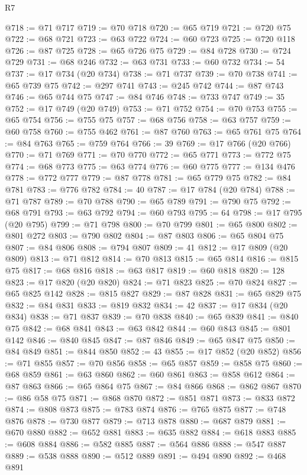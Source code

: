 \begin{lexlean}{R7}
\begin{coremodule}
@718 := @71 @717
@719 := @70 @718
@720 := @65 @719
@721 := @720 @75
@722 := @68 @721
@723 := @63 @722
@724 := @60 @723
@725 := @720 @118
@726 := @87 @725
@728 := @65 @726 @75
@729 := @84 @728
@730 := @724 @729
@731 := @68 @246
@732 := @63 @731
@733 := @60 @732
@734 := 54
@737 := @17 @734 (@20 @734)
@738 := @71 @737
@739 := @70 @738
@741 := @65 @739 @75
@742 := @297 @741
@743 := @245 @742
@744 := @87 @743
@746 := @65 @744 @75
@747 := @84 @746
@748 := @733 @747
@749 := 35
@752 := @17 @749 (@20 @749)
@753 := @71 @752
@754 := @70 @753
@755 := @65 @754
@756 := @755 @75
@757 := @68 @756
@758 := @63 @757
@759 := @60 @758
@760 := @755 @462
@761 := @87 @760
@763 := @65 @761 @75
@764 := @84 @763
@765 := @759 @764
@766 := 39
@769 := @17 @766 (@20 @766)
@770 := @71 @769
@771 := @70 @770
@772 := @65 @771
@773 := @772 @75
@774 := @68 @773
@775 := @63 @774
@776 := @60 @775
@777 := @134 @476
@778 := @772 @777
@779 := @87 @778
@781 := @65 @779 @75
@782 := @84 @781
@783 := @776 @782
@784 := 40
@787 := @17 @784 (@20 @784)
@788 := @71 @787
@789 := @70 @788
@790 := @65 @789
@791 := @790 @75
@792 := @68 @791
@793 := @63 @792
@794 := @60 @793
@795 := 64
@798 := @17 @795 (@20 @795)
@799 := @71 @798
@800 := @70 @799
@801 := @65 @800
@802 := @801 @272
@803 := @790 @802
@804 := @87 @803
@806 := @65 @804 @75
@807 := @84 @806
@808 := @794 @807
@809 := 41
@812 := @17 @809 (@20 @809)
@813 := @71 @812
@814 := @70 @813
@815 := @65 @814
@816 := @815 @75
@817 := @68 @816
@818 := @63 @817
@819 := @60 @818
@820 := 128
@823 := @17 @820 (@20 @820)
@824 := @71 @823
@825 := @70 @824
@827 := @65 @825 @142
@828 := @815 @827
@829 := @87 @828
@831 := @65 @829 @75
@832 := @84 @831
@833 := @819 @832
@834 := 42
@837 := @17 @834 (@20 @834)
@838 := @71 @837
@839 := @70 @838
@840 := @65 @839
@841 := @840 @75
@842 := @68 @841
@843 := @63 @842
@844 := @60 @843
@845 := @801 @142
@846 := @840 @845
@847 := @87 @846
@849 := @65 @847 @75
@850 := @84 @849
@851 := @844 @850
@852 := 43
@855 := @17 @852 (@20 @852)
@856 := @71 @855
@857 := @70 @856
@858 := @65 @857
@859 := @858 @75
@860 := @68 @859
@861 := @63 @860
@862 := @60 @861
@863 := @858 @612
@864 := @87 @863
@866 := @65 @864 @75
@867 := @84 @866
@868 := @862 @867
@870 := @86 @58 @75
@871 := @868 @870
@872 := @851 @871
@873 := @833 @872
@874 := @808 @873
@875 := @783 @874
@876 := @765 @875
@877 := @748 @876
@878 := @730 @877
@879 := @713 @878
@880 := @687 @879
@881 := @670 @880
@882 := @652 @881
@883 := @635 @882
@884 := @618 @883
@885 := @608 @884
@886 := @582 @885
@887 := @564 @886
@888 := @547 @887
@889 := @538 @888
@890 := @512 @889
@891 := @494 @890
@892 := @468 @891

\end{coremodule}
\end{lexlean}
